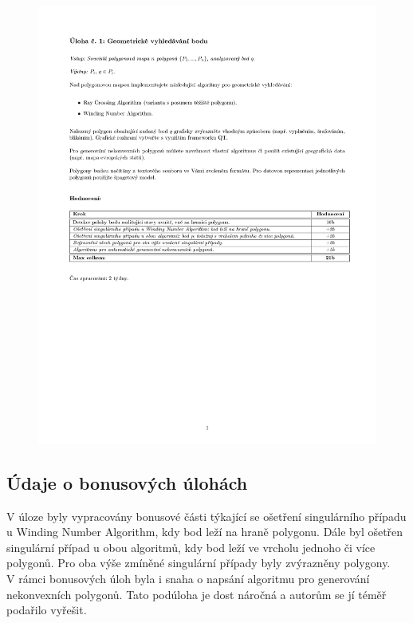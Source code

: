 \documentclass[a4paper, 12pt]{article}
\begin{document}
\begin{figure}[h!]
	\centering
	\includegraphics[clip, trim=0cm 10cm 0cm 3cm, width=1.2\textwidth]{zadani.pdf}
\end{figure}

\subsection{Údaje o bonusových úlohách}
V úloze byly vypracovány bonusové části týkající se ošetření singulárního případu u Winding Number Algorithm, kdy bod leží na hraně polygonu. Dále byl ošetřen singulární případ u obou algoritmů, kdy bod leží ve vrcholu jednoho či více polygonů. Pro oba výše zmíněné singulární případy byly zvýrazněny polygony. \\
V rámci bonusových úloh byla i snaha o napsání algoritmu pro generování nekonvexních polygonů. Tato podúloha je dost náročná a autorům se jí téměř podařilo vyřešit.


\clearpage
\end{document}
